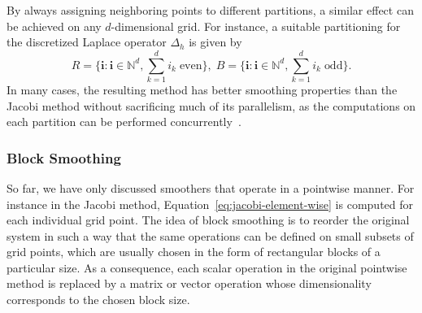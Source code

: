 By always assigning neighboring points to different partitions, a similar effect can be achieved on any $d$-dimensional grid. 
For instance, a suitable partitioning for the discretized Laplace operator $\Delta_h$ is given by
\begin{equation}
		R = \{ \bm{i} : \bm{i} \in \mathbb{N}^d, \sum_{k=1}^d i_k \; \text{even} \}, \;
		B = \{ \bm{i} : \bm{i} \in \mathbb{N}^d, \sum_{k=1}^d i_k \; \text{odd} \}.
\end{equation}
In many cases, the resulting method has better smoothing properties than the Jacobi method without sacrificing much of its parallelism, as the computations on each partition can be performed concurrently~\cite{trottenberg2000multigrid}.
\subsubsection{Block Smoothing}
\label{subsec:block-smoothing}
So far, we have only discussed smoothers that operate in a pointwise manner.
For instance in the Jacobi method, Equation~\eqref{eq:jacobi-element-wise} is computed for each individual grid point.
The idea of block smoothing is to reorder the original system in such a way that the same operations can be defined on small subsets of grid points, which are usually chosen in the form of rectangular blocks of a particular size.
As a consequence, each scalar operation in the original pointwise method is replaced by a matrix or vector operation whose dimensionality corresponds to the chosen block size.

